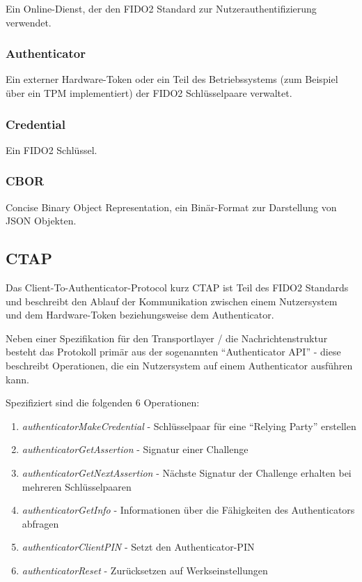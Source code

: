 \documentclass[journal]{IEEEtran}
\begin{document}
Ein Online-Dienst, der den FIDO2 Standard zur Nutzerauthentifizierung
verwendet.

\subsubsection{Authenticator}

Ein externer Hardware-Token oder ein Teil des Betriebssystems (zum Beispiel
über ein TPM implementiert) der FIDO2 Schlüsselpaare verwaltet.

\subsubsection{Credential}

Ein FIDO2 Schlüssel.

\subsubsection{CBOR}

Concise Binary Object Representation, ein Binär-Format zur Darstellung von JSON
Objekten.

\subsection{CTAP}

Das Client-To-Authenticator-Protocol kurz CTAP ist Teil des FIDO2 Standards und
beschreibt den Ablauf der Kommunikation zwischen einem Nutzersystem und dem
Hardware-Token beziehungsweise dem Authenticator.

Neben einer Spezifikation für den Transportlayer / die Nachrichtenstruktur
besteht das Protokoll primär aus der sogenannten ``Authenticator API'' - diese
beschreibt Operationen, die ein Nutzersystem auf einem Authenticator ausführen
kann.~\cite{ctapspec}

Spezifiziert sind die folgenden 6 Operationen:

\begin{enumerate}
	\item \textit{authenticatorMakeCredential} - Schlüsselpaar für eine
		``Relying Party'' erstellen
	\item \textit{authenticatorGetAssertion} - Signatur einer Challenge
	\item \textit{authenticatorGetNextAssertion} - Nächste Signatur der
		Challenge erhalten bei mehreren Schlüsselpaaren
	\item \textit{authenticatorGetInfo} - Informationen über die Fähigkeiten
		des Authenticators abfragen
	\item \textit{authenticatorClientPIN} - Setzt den Authenticator-PIN
	\item \textit{authenticatorReset} - Zurücksetzen auf Werkseinstellungen
\end{enumerate}
\end{document}
